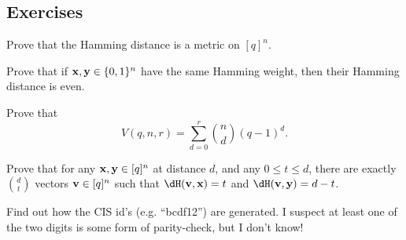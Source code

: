 \documentclass[a4paper, 11pt, openany]{book}
\begin{document}




\subsection{Exercises}



\begin{exercise}
Prove that the Hamming distance is a metric on $[q]^n$.
\end{exercise}




\begin{exercise}
Prove that if ${\bf x}, {\bf y} \in \{0,1\}^n$ have the same Hamming weight, then their Hamming distance is even.
\end{exercise}









\begin{exercise}
Prove that
\[
    V(q,n,r) = \sum_{d=0}^r \binom{n}{d} (q-1)^d.
\]
\end{exercise}


\begin{exercise}
Prove that for any ${\bf x}, {\bf y} \in [q]^n$ at distance $d$, and any $0 \le t \le d$, there are exactly $\binom{d}{t}$ vectors ${\bf v} \in [q]^n$ such that $\dH({\bf v}, {\bf x}) = t$ and $\dH({\bf v}, {\bf y}) = d-t$.
\end{exercise}


\begin{exercise}
Find out how the CIS id's (e.g. ``bcdf12'') are generated. I suspect at least one of the two digits is some form of parity-check, but I don't know!
\end{exercise}
\end{document}
